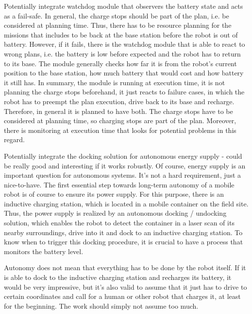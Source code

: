 \documentclass[german, master, expose, latin1]{base/thesis_KBS}
\begin{document}
Potentially integrate watchdog module that observers the battery state and acts as a fail-safe. In general, the charge stops should be part of the plan,
i.e. be considered at planning time. Thus, there has to be resource planning for the missions that includes to be back at the base station before the robot is out of battery.
However, if it fails, there is the watchdog module that is able to react to wrong plans, i.e. the battery is low before expected and the robot has to return to its base.
The module generally checks how far it is from the robot's current position to the base station, how much battery that would cost and how battery it still has.
In summary, the module is running at execution time, it is not planning the charge stops beforehand, it just reacts to failure cases, in which the robot has to preempt
the plan execution, drive back to its base and recharge. Therefore, in general it is planned to have both. The charge stops have to be considered at planning time,
so charging stops are part of the plan. Moreover, there is monitoring at execution time that looks for potential problems in this regard.\newline

Potentially integrate the docking solution for autonomous energy supply - could be really good and interesting if it works robustly.
Of course, energy supply is an important question for autonomous systems. It's not a hard requirement, just a nice-to-have.
The first essential step towards long-term autonomy of a mobile robot is of course to ensure its power supply.
For this purpose, there is an inductive charging station, which is located in a mobile container on the field site.
Thus, the power supply is realized by an autonomous docking / undocking solution, which enables the robot to detect the container in a laser scan
of its nearby surroundings, drive into it and dock to an inductive charging station.
To know when to trigger this docking procedure, it is crucial to have a process that monitors the battery level.\newline

Autonomy does not mean that everything has to be done by the robot itself. If it is able to dock to the inductive charging station and recharges its battery,
it would be very impressive, but it's also valid to assume that it just has to drive to certain coordinates and call for a human or other robot that charges it,
at least for the beginning. The work should simply not assume too much.\newline
\end{document}
